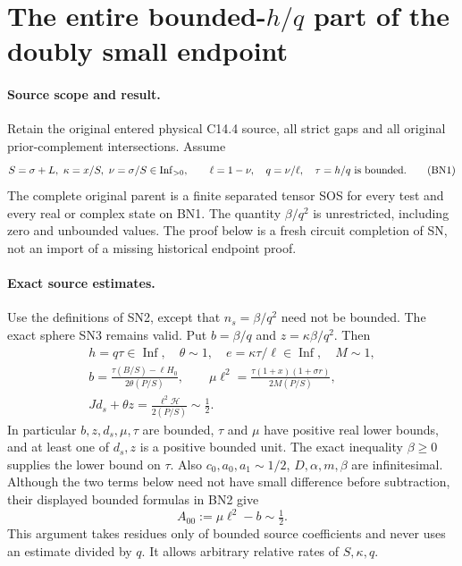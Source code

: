\section{The entire bounded-$h/q$ part of the doubly small endpoint}
\label{sec:new-c144-bounded-h-ratio}

\paragraph{Source scope and result.}
Retain the original entered physical C14.4 source, all strict gaps and
all original prior-complement intersections. Assume
\[
 S=\sigma+L,\ \kappa=x/S,\ \nu=\sigma/S
       \in\operatorname{Inf}_{>0},\qquad
 \ell=1-\nu,\quad q=\nu/\ell,\quad
 \tau=h/q\ \hbox{is bounded}.
 \tag{BN1}
\]
The complete original parent is a finite separated tensor SOS for
every test and every real or complex state on BN1. The quantity
$\beta/q^2$ is unrestricted, including zero and unbounded values.
The proof below is a fresh circuit completion of SN, not an import of
a missing historical endpoint proof.

\paragraph{Exact source estimates.}
Use the definitions of SN2, except that $n_s=\beta/q^2$ need not be
bounded. The exact sphere SN3 remains valid. Put $b=\beta/q$ and
$z=\kappa\beta/q^2$. Then
\[
\begin{gathered}
 h=q\tau\in\operatorname{Inf},\quad\theta\sim1,\quad
 e=\kappa\tau/\ell\in\operatorname{Inf},\quad M\sim1,\\
 b=\frac{\tau(B/S)-\ell H_0}{2\theta(P/S)},\qquad
 \mu\ell^2=\frac{\tau(1+x)(1+\sigma r)}{2M(P/S)},\\
 Jd_s+\theta z=\frac{\ell^2\mathcal H}{2(P/S)}\sim\tfrac12.
\end{gathered}\tag{BN2}
\]
In particular $b,z,d_s,\mu,\tau$ are bounded, $\tau$ and $\mu$
have positive real lower bounds, and at least one of $d_s,z$ is a
positive bounded unit. The exact inequality $\beta\ge0$ supplies
the lower bound on $\tau$. Also
$c_0,a_0,a_1\sim1/2$, $D,\alpha,m,\beta$ are infinitesimal.
Although the two terms below need not have small difference before
subtraction, their displayed bounded formulas in BN2 give
\[
                  A_{00}:=\mu\ell^2-b\sim\tfrac12.
 \tag{BN3}
\]
This argument takes residues only of bounded source coefficients and
never uses an estimate divided by $q$. It allows arbitrary relative
rates of $S,\kappa,q$.

